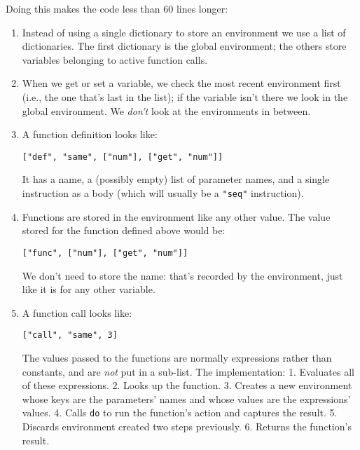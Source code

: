 \documentclass{scrbook}
\begin{document}
Doing this makes the code less than 60 lines longer:

\begin{enumerate}

\item 

Instead of using a single dictionary to store an environment
    we use a list of dictionaries.
    The first dictionary is the global environment;
    the others store variables belonging to active function calls.



\item 

When we get or set a variable,
    we check the most recent environment first
    (i.e., the one that's last in the list);
    if the variable isn't there we look in the global environment.
    We \emph{don't} look at the environments in between.



\item 

A function definition looks like:

\begin{lstlisting}[frame=single,frameround=tttt]
["def", "same", ["num"], ["get", "num"]]
\end{lstlisting}


It has a name, a (possibly empty) list of parameter names,
and a single instruction as a body
(which will usually be a \texttt{"seq"} instruction).



\item 

Functions are stored in the environment like any other value.
    The value stored for the function defined above would be:

\begin{lstlisting}[frame=single,frameround=tttt]
["func", ["num"], ["get", "num"]]
\end{lstlisting}


We don't need to store the name: that's recorded by the environment,
just like it is for any other variable.



\item 

A function call looks like:

\begin{lstlisting}[frame=single,frameround=tttt]
["call", "same", 3]
\end{lstlisting}


The values passed to the functions are normally expressions rather than constants,
and are \emph{not} put in a sub-list.
The implementation:
1.  Evaluates all of these expressions.
2.  Looks up the function.
3.  Creates a new environment whose keys are the parameters' names
    and whose values are the expressions' values.
4.  Calls \texttt{do} to run the function's action and captures the result.
5.  Discards environment created two steps previously.
6.  Returns the function's result.



\end{enumerate}
\end{document}
